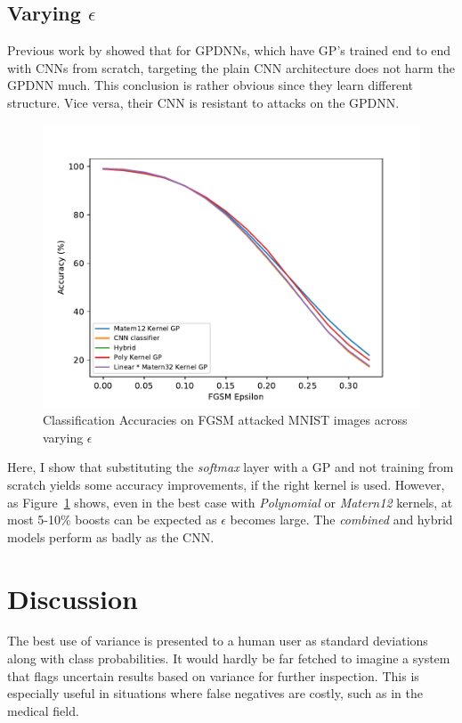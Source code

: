\documentclass{article}
\begin{document}
\subsection{Varying $\epsilon$}
Previous work by \citet{Bradshaw2017} showed that for GPDNNs, which have GP's trained end to end with CNNs from scratch, targeting the plain CNN architecture does not harm the GPDNN much. This conclusion is rather obvious since they learn different structure. Vice versa, their CNN is resistant to attacks on the GPDNN.

\begin{figure}[h!]
\centering
\includegraphics[width=\hsize]{./figures/adversarial/epsilons.pdf}
\caption{Classification Accuracies on FGSM attacked MNIST images across varying $\epsilon$}
\label{fig:adv:epsilons}
\end{figure}

Here, I show that substituting the \textit{softmax} layer with a GP and not training from scratch yields some accuracy improvements, if the right kernel is used. However, as Figure~\ref{fig:adv:epsilons} shows, even in the best case with \textit{Polynomial} or \textit{Matern12} kernels, at most 5-10\% boosts can be expected as $\epsilon$ becomes large. The \textit{combined} and hybrid models perform as badly as the CNN.



\section{Discussion}
\label{sec:discussion}

The best use of variance is presented to a human user as standard deviations along with class probabilities. It would hardly be far fetched to imagine a system that flags uncertain results based on variance for further inspection. This is especially useful in situations where false negatives are costly, such as in the medical field.
\end{document}
